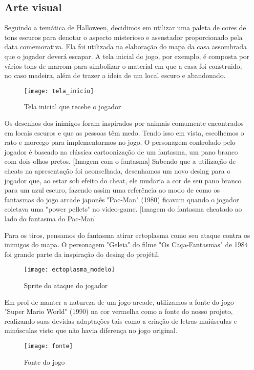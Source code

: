 \documentclass[conference]{IEEEtran}
\begin{document}
\subsection{Arte visual}
Seguindo a temática de Halloween, decidimos em utilizar uma paleta de cores de tons escuros para denotar o aspecto misterioso e assustador proporcionado pela data comemorativa. Ela foi utilizada na elaboração do mapa da casa assombrada que o jogador deverá escapar. A tela inicial do jogo, por exemplo, é composta por vários tons de marrom para simbolizar o material em que a casa foi construido, no caso madeira, além de trazer a ideia de um local escuro e abandonado.
\begin{figure}[H]
\centering
\texttt{[image: tela\_inicio]}
\caption{Tela inicial que recebe o jogador}
\end{figure}  

Os desenhos dos inimigos foram inspirados por animais comumente encontrados em locais escuros e que as pessoas têm medo. Tendo isso em vista, escolhemos o rato e morcego para implementarmos no jogo.
O personagem controlado pelo jogador é baseado na clássica cartoonização de um fantasma, um pano branco com dois olhos pretos.
[Imagem com o fantasma]
Sabendo que a utilização de cheats na apresentação foi aconselhada, desenhamos um novo desing para o jogador que, ao estar sob efeito do cheat, ele mudaria a cor de seu pano branco para um azul escuro, fazendo assim uma referência ao modo de como os fantasmas do jogo arcade japonês "Pac-Man" (1980) ficavam quando o jogador coletava uma "power pellets" no video-game.
[Imagem do fantasma cheatado ao lado do fantasma do Pac-Man]

Para os tiros, pensamos do fantasma atirar ectoplasma como seu ataque contra os inimigos do mapa. O personagem "Geleia" do filme "Os Caça-Fantasmas" de 1984 foi grande parte da inspiração do desing do projétil.

\begin{figure}[H]
\centering
\texttt{[image: ectoplasma\_modelo]}
\caption{Sprite do ataque do jogador}
\end{figure}  

Em prol de manter a natureza de um jogo arcade, utilizamos a fonte do jogo "Super Mario World" (1990) na cor vermelha como a fonte do nosso projeto, realizando suas devidas adaptações tais como a criação de letras maiúsculas e minúsculas visto que não havia diferença no jogo original. 

\begin{figure}[H]
\centering
\texttt{[image: fonte]}
\caption{Fonte do jogo}
\end{figure} 
\end{document}
